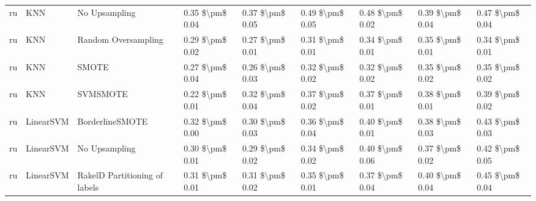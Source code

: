 \begin{tabular}{lllllllll}
      ru &                             KNN &                 No Upsampling & 0.35 \$\textbackslash pm\$ 0.04 &           0.37 \$\textbackslash pm\$ 0.05 &       0.49 \$\textbackslash pm\$ 0.05 &        0.48 \$\textbackslash pm\$ 0.02 &                         0.39 \$\textbackslash pm\$ 0.04 &     0.47 \$\textbackslash pm\$ 0.04 \\
      ru &                             KNN &           Random Oversampling & 0.29 \$\textbackslash pm\$ 0.02 &           0.27 \$\textbackslash pm\$ 0.01 &       0.31 \$\textbackslash pm\$ 0.01 &        0.34 \$\textbackslash pm\$ 0.01 &                         0.35 \$\textbackslash pm\$ 0.01 &     0.34 \$\textbackslash pm\$ 0.01 \\
      ru &                             KNN &                         SMOTE & 0.27 \$\textbackslash pm\$ 0.04 &           0.26 \$\textbackslash pm\$ 0.03 &       0.32 \$\textbackslash pm\$ 0.02 &        0.32 \$\textbackslash pm\$ 0.02 &                         0.35 \$\textbackslash pm\$ 0.02 &     0.35 \$\textbackslash pm\$ 0.02 \\
      ru &                             KNN &                      SVMSMOTE & 0.22 \$\textbackslash pm\$ 0.01 &           0.32 \$\textbackslash pm\$ 0.04 &       0.37 \$\textbackslash pm\$ 0.02 &        0.37 \$\textbackslash pm\$ 0.01 &                         0.38 \$\textbackslash pm\$ 0.01 &     0.39 \$\textbackslash pm\$ 0.02 \\
      ru &                       LinearSVM &               BorderlineSMOTE & 0.32 \$\textbackslash pm\$ 0.00 &           0.30 \$\textbackslash pm\$ 0.03 &       0.36 \$\textbackslash pm\$ 0.04 &        0.40 \$\textbackslash pm\$ 0.01 &                         0.38 \$\textbackslash pm\$ 0.03 &     0.43 \$\textbackslash pm\$ 0.03 \\
      ru &                       LinearSVM &                 No Upsampling & 0.30 \$\textbackslash pm\$ 0.01 &           0.29 \$\textbackslash pm\$ 0.02 &       0.34 \$\textbackslash pm\$ 0.02 &        0.40 \$\textbackslash pm\$ 0.06 &                         0.37 \$\textbackslash pm\$ 0.02 &     0.42 \$\textbackslash pm\$ 0.05 \\
      ru &                       LinearSVM & RakelD Partitioning of labels & 0.31 \$\textbackslash pm\$ 0.01 &           0.31 \$\textbackslash pm\$ 0.02 &       0.35 \$\textbackslash pm\$ 0.01 &        0.37 \$\textbackslash pm\$ 0.04 &                         0.40 \$\textbackslash pm\$ 0.04 &     0.45 \$\textbackslash pm\$ 0.04 \\

\end{tabular}
